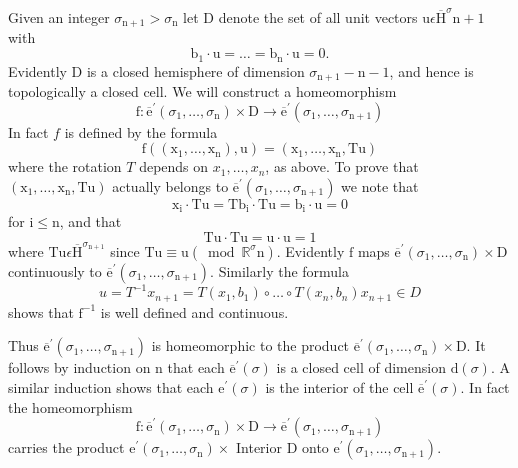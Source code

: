 \documentclass[10pt]{article}
\begin{document}
Given an integer $\sigma_{\mathrm{n}+1}>\sigma_{\mathrm{n}}$ let $\mathrm{D}$ denote the set of all unit vectors $\mathrm{u} \epsilon \overline{\mathrm{H}}^{\sigma} \mathrm{n+1}$ with
$$
\mathrm{b}_{1} \cdot \mathrm{u}=\ldots=\mathrm{b}_{\mathrm{n}} \cdot \mathrm{u}=0 .
$$
Evidently $\mathrm{D}$ is a closed hemisphere of dimension $\sigma_{\mathrm{n}+1}-\mathrm{n}-1$, and hence is topologically a closed cell. We will construct a homeomorphism
$$
\mathrm{f}: \overline{\mathrm{e}}^{\prime}\left(\sigma_{1}, \ldots, \sigma_{\mathrm{n}}\right) \times \mathrm{D} \rightarrow \overline{\mathrm{e}}^{\prime}\left(\sigma_{1}, \ldots, \sigma_{\mathrm{n}+1}\right)
$$
In fact $f$ is defined by the formula
$$
\mathrm{f}\left(\left(\mathrm{x}_{1}, \ldots, \mathrm{x}_{\mathrm{n}}\right), \mathrm{u}\right)=\left(\mathrm{x}_{1}, \ldots, \mathrm{x}_{\mathrm{n}}, \mathrm{Tu}\right)
$$
where the rotation $T$ depends on $x_{1}, \ldots, x_{n}$, as above. To prove that $\left(\mathrm{x}_{1}, \ldots, \mathrm{x}_{\mathrm{n}}, \mathrm{Tu}\right)$ actually belongs to $\overline{\mathrm{e}}^{\prime}\left(\sigma_{1}, \ldots, \sigma_{\mathrm{n}+1}\right)$ we note that
$$
\mathrm{x}_{\mathrm{i}} \cdot \mathrm{Tu}=\mathrm{Tb}_{\mathrm{i}} \cdot \mathrm{Tu}=\mathrm{b}_{\mathrm{i}} \cdot \mathrm{u}=0
$$
for $\mathrm{i} \leq \mathrm{n}$, and that
$$
\mathrm{Tu} \cdot \mathrm{Tu}=\mathrm{u} \cdot \mathrm{u}=1
$$
where $\mathrm{Tu} \epsilon \overline{\mathrm{H}}^{\sigma_{\mathrm{n}+1}}$ since $\mathrm{Tu} \equiv \mathrm{u}\left(\bmod \mathbb{R}^{\sigma} \mathrm{n}\right)$. Evidently $\mathrm{f}$ maps $\overline{\mathrm{e}}^{\prime}\left(\sigma_{1}, \ldots, \sigma_{\mathrm{n}}\right) \times \mathrm{D}$ continuously to $\overline{\mathrm{e}}^{\prime}\left(\sigma_{1}, \ldots, \sigma_{\mathrm{n}+1}\right)$. Similarly the formula
$$
u=T^{-1} x_{n+1}=T\left(x_{1}, b_{1}\right) \circ \ldots \circ T\left(x_{n}, b_{n}\right) x_{n+1} \in D
$$
shows that $\mathrm{f}^{-1}$ is well defined and continuous.

Thus $\overline{\mathrm{e}}^{\prime}\left(\sigma_{1}, \ldots, \sigma_{\mathrm{n}+1}\right)$ is homeomorphic to the product $\overline{\mathrm{e}}^{\prime}\left(\sigma_{1}, \ldots, \sigma_{\mathrm{n}}\right) \times \mathrm{D}$. It follows by induction on $\mathrm{n}$ that each $\overline{\mathrm{e}}^{\prime}(\sigma)$ is a closed cell of dimension $\mathrm{d}(\sigma)$. A similar induction shows that each $\mathrm{e}^{\prime}(\sigma)$ is the interior of the cell $\overline{\mathrm{e}}^{\prime}(\sigma)$. In fact the homeomorphism
$$
\mathrm{f}: \overline{\mathrm{e}}^{\prime}\left(\sigma_{1}, \ldots, \sigma_{\mathrm{n}}\right) \times \mathrm{D} \rightarrow \overline{\mathrm{e}}^{\prime}\left(\sigma_{1}, \ldots, \sigma_{\mathrm{n}+1}\right)
$$
carries the product $\mathrm{e}^{\prime}\left(\sigma_{1}, \ldots, \sigma_{\mathrm{n}}\right) \times$ Interior $\mathrm{D}$ onto $\mathrm{e}^{\prime}\left(\sigma_{1}, \ldots, \sigma_{\mathrm{n}+1}\right)$.
\end{document}
